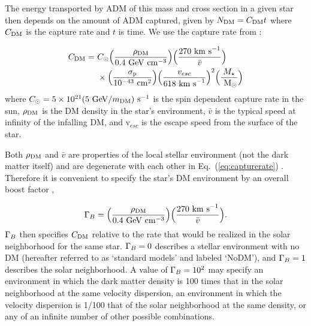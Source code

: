 \documentclass[useAMS,usenatbib]{mnras}
\begin{document}
  The energy transported by ADM of this mass and cross section in a given star then depends on the amount of ADM captured, given by $N_{\mathrm{DM}} = C_{\mathrm{DM}} t$ where $C_{\mathrm{DM}}$ is the capture rate and $t$ is time. We use the capture rate from \citet{Zentner2011AsymmetricDwarfs} \citep[see also][]{Gould1992CosmologicalAnnihilations, Zentner2009High-energySun}:

  \begin{align}
  \begin{split}
    \label{eq:capturerate}
    C_{\mathrm{DM}} =\ & C_{\odot}
    \Big(\frac{\rho_{\mathrm{DM}}}{0.4 \ \mathrm{GeV} \ \mathrm{cm}^{-3}}\Big)
    \Big(\frac{270 \ \mathrm{km\ s}^{-1}}{\bar{v}}\Big) \\
    & \times \Big(\frac{\sigma_{\mathrm{p}}}{10^{-43} \ \mathrm{cm}^2}\Big)
    \Big(\frac{v_{esc}}{618 \ \mathrm{km\ s}^{-1}}\Big)^2
    \Big(\frac{M_{\star}}{\ \mathrm{M}_{\odot}}\Big)
  \end{split}
  \end{align}
  where $C_{\odot} = 5 \times 10^{21} (5 \ \mathrm{GeV}/ m_{\mathrm{DM}}) \ \mathrm{s}^{-1}$ is the spin dependent capture
  rate in the sun, $\rho_{\mathrm{DM}}$ is the DM density in the star's environment,
  $\bar{v}$ is the typical speed at infinity of the infalling DM,
  and v$_{esc}$ is the escape speed from the surface of the star.

  Both $\rho_{\mathrm{DM}}$ and $\bar{v}$ are properties of the local stellar environment (not the dark matter itself) and are degenerate with each other in Eq.~(\ref{eq:capturerate}) . Therefore it is convenient to specify  the star's DM environment by an overall boost factor \citep{Zentner2011AsymmetricDwarfs,Hurst2015},

  \begin{equation}
  \Gamma_B = \Big(\frac{\rho_{\mathrm{DM}}}{0.4 \ \mathrm{GeV} \ \mathrm{cm}^{-3}}\Big) \Big(\frac{270 \ \mathrm{km\ s}^{-1}}{\bar{v}}\Big).
  \label{eq:gammab}
  \end{equation}
  $\Gamma_B$ then specifies $C_{\mathrm{DM}}$ relative to the rate that would be realized in the solar neighborhood for the same star.
  $\Gamma_B = 0$ describes a stellar environment with no DM (hereafter referred to as `standard models' and labeled `NoDM'), and $\Gamma_B = 1$ describes the solar neighborhood. A value of $\Gamma_B = 10^{2}$ may specify an environment in which the dark matter density is 100 times that in the solar neighborhood at the same velocity dispersion, an environment in which the velocity dispersion is 1/100 that of the solar neighborhood at the same density, or any of an infinite number of other possible combinations.
\end{document}
